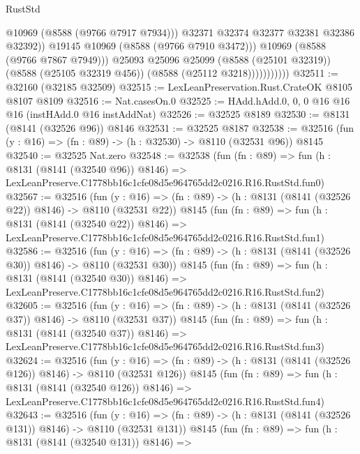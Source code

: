 \begin{lexlean}{RustStd}
\begin{coremodule}
                                @10969
                                (@8588 (@9766 @7917 @7934)))
                              @32371
                              @32374
                              @32377
                              @32381
                              @32386
                              @32392))
                          @19145
                          @10969
                          (@8588 (@9766 @7910 @3472)))
                        @10969
                        (@8588 (@9766 @7867 @7949)))
                      @25093
                      @25096
                      @25099
                      (@8588 (@25101 @32319))
                      (@8588 (@25105 @32319 @456))
                      (@8588 (@25112 @3218)))))))))))
@32511 := @32160 (@32185 @32509)
@32515 := LexLeanPreservation.Rust.CrateOK @8105 @8107 @8109
@32516 := Nat.casesOn.{0}
@32525 := HAdd.hAdd.{0, 0, 0} @16 @16 @16 (instHAdd.{0} @16 instAddNat)
@32526 := @32525 @8189
@32530 := @8131 (@8141 (@32526 @96)) @8146
@32531 := @32525 @8187
@32538 := @32516 (fun (y : @16) => (fn : @89) -> (h : @32530) -> @8110 (@32531 @96)) @8145
@32540 := @32525 Nat.zero
@32548 := @32538
    (fun (fn : @89) =>
    fun (h : @8131 (@8141 (@32540 @96)) @8146) =>
    LexLeanPreserve.C1778bb16c1cfe08d5e964765dd2c0216.R16.RustStd.fun0)
@32567 := @32516
    (fun (y : @16) => (fn : @89) -> (h : @8131 (@8141 (@32526 @22)) @8146) -> @8110 (@32531 @22))
    @8145
    (fun (fn : @89) =>
    fun (h : @8131 (@8141 (@32540 @22)) @8146) =>
    LexLeanPreserve.C1778bb16c1cfe08d5e964765dd2c0216.R16.RustStd.fun1)
@32586 := @32516
    (fun (y : @16) => (fn : @89) -> (h : @8131 (@8141 (@32526 @30)) @8146) -> @8110 (@32531 @30))
    @8145
    (fun (fn : @89) =>
    fun (h : @8131 (@8141 (@32540 @30)) @8146) =>
    LexLeanPreserve.C1778bb16c1cfe08d5e964765dd2c0216.R16.RustStd.fun2)
@32605 := @32516
    (fun (y : @16) => (fn : @89) -> (h : @8131 (@8141 (@32526 @37)) @8146) -> @8110 (@32531 @37))
    @8145
    (fun (fn : @89) =>
    fun (h : @8131 (@8141 (@32540 @37)) @8146) =>
    LexLeanPreserve.C1778bb16c1cfe08d5e964765dd2c0216.R16.RustStd.fun3)
@32624 := @32516
    (fun (y : @16) => (fn : @89) -> (h : @8131 (@8141 (@32526 @126)) @8146) -> @8110 (@32531 @126))
    @8145
    (fun (fn : @89) =>
    fun (h : @8131 (@8141 (@32540 @126)) @8146) =>
    LexLeanPreserve.C1778bb16c1cfe08d5e964765dd2c0216.R16.RustStd.fun4)
@32643 := @32516
    (fun (y : @16) => (fn : @89) -> (h : @8131 (@8141 (@32526 @131)) @8146) -> @8110 (@32531 @131))
    @8145
    (fun (fn : @89) =>
    fun (h : @8131 (@8141 (@32540 @131)) @8146) =>

\end{coremodule}
\end{lexlean}
